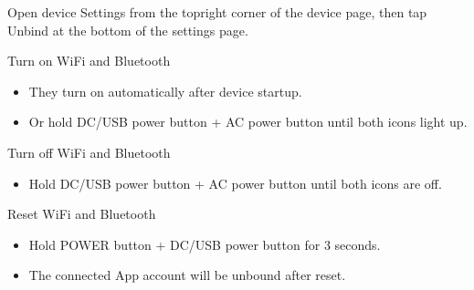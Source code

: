 \documentclass[a4paper,10pt,twoside,openany,english]{sphinxhowto}
\let\sphinxpxdimen\pdfpxdimen\else\newdimen\sphinxpxdimen
\begin{document}
\sphinxAtStartPar
{}

\sphinxAtStartPar
Open device Settings from the top\sphinxhyphen{}right corner of the device page,
then tap Unbind at the bottom of the settings page.

\sphinxAtStartPar
{}

 Turn on Wi\sphinxhyphen{}Fi and Bluetooth
\begin{itemize}
\item {} 
\sphinxAtStartPar
They turn on automatically after device startup.

\item {} 
\sphinxAtStartPar
Or hold DC/USB power button + AC power button until both icons light up.

\end{itemize}

 Turn off Wi\sphinxhyphen{}Fi and Bluetooth
\begin{itemize}
\item {} 
\sphinxAtStartPar
Hold DC/USB power button + AC power button until both icons are off.

\end{itemize}

 Reset Wi\sphinxhyphen{}Fi and Bluetooth
\begin{itemize}
\item {} 
\sphinxAtStartPar
Hold POWER button + DC/USB power button for 3 seconds.

\item {} 
\sphinxAtStartPar
The connected App account will be unbound after reset.

\end{itemize}

\noindent\sphinxincludegraphics[width=320\sphinxpxdimen]{{fig}.png}



\renewcommand{\indexname}{Index}
\printindex
\end{document}
